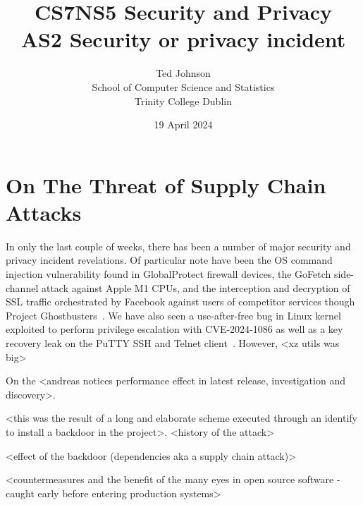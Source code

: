 \documentclass[a4paper,oneside,12pt]{article}
\title{CS7NS5 Security and Privacy\\AS2 Security or privacy incident}
\author{Ted Johnson\\School of Computer Science and Statistics\\Trinity College Dublin}
\date{19 April 2024}
\begin{document}
\maketitle
\onehalfspacing
\raggedright

\section*{On The Threat of Supply Chain Attacks}

In only the last couple of weeks, there has been a number of major security and privacy incident revelations. Of particular note have been the OS command injection vulnerability found in GlobalProtect firewall devices, the GoFetch side-channel attack against Apple M1 CPUs, and the interception and decryption of SSL traffic orchestrated by Facebook against users of competitor services though Project Ghostbusters~\cite{CVE-2024-3400, gofetch, 369872}. We have also seen a use-after-free bug in Linux kernel exploited to perform privilege escalation with CVE-2024-1086 as well as a key recovery leak on the PuTTY SSH and Telnet client~\cite{CVE-2024-1086, CVE-2024-31497}. However, <xz utils was big>

On the <andreas notices performance effect in latest release, investigation and discovery>.
\cite{CVE-2024-3094}
\cite{LWN-freund}
\cite{LWN-967180}

<this was the result of a long and elaborate scheme executed through an identify to install a backdoor in the project>. <history of the attack>

<effect of the backdoor (dependencies aka a supply chain attack)>

<countermeasures and the benefit of the many eyes in open source software - caught early before entering production systems>

\printbibliography
\end{document}
